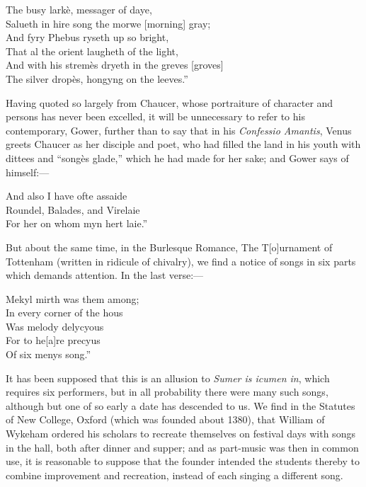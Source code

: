 \begin{scverse}
The busy larkè, messager of daye,\\
Salueth in hire song the morwe [morning] gray;\\
And fyry Phebus ryseth up so bright,\\
That al the orient laugheth of the light,\\
And with his stremès dryeth in the greves [groves]\\
The silver dropès, hongyng on the leeves.”
\end{scverse}
Having quoted so largely from Chaucer, whose portraiture of character and
persons has never been excelled, it will be unnecessary to refer to his contemporary, Gower, further than to say that in his \textit{Confessio Amantis}, Venus greets
Chaucer as her disciple and poet, who had filled the land in his youth with
dittees and “songès glade,” which he had made for her sake; and Gower says of
himself:—
\begin{scverse}
And also I have ofte assaide\\
Roundel, Balades, and Virelaie\\
For her on whom myn hert laie.”
\end{scverse}
But about the same time, in the Burlesque Romance, The T[o]urnament of
Tottenham (written in ridicule of chivalry), we find a notice of songs in six parts
which demands attention. In the last verse:—
\begin{scverse}
Mekyl mirth was them among;\\
In every corner of the hous\\
Was melody delycyous\\
For to he[a]re precyus\\
\vin\vin Of six menys song.”
\end{scverse}

It has been supposed that this is an allusion to \textit{Sumer is icumen in}, which
requires six performers, but in all probability there were many such songs,
although but one of so early a date has descended to us. We find in the Statutes
of New College, Oxford (which was founded about 1380), that William of
Wykeham ordered his scholars to recreate themselves on festival days with songs
in the hall, both after dinner and supper; and as part-music was then in common
use, it is reasonable to suppose that the founder intended the students thereby to
combine improvement and recreation, instead of each singing a different song.


